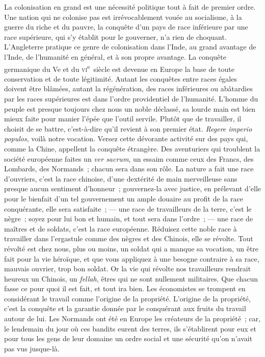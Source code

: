 \documentclass[french,twoside]{book} %
\begin{document}
La colonisation en grand est une nécessité politique tout à fait de premier ordre. Une nation qui ne colonise pas est irrévocablement vouée au socialisme, à la guerre du riche et du pauvre, la conquête d’un pays de race inférieure par une race supérieure, qui s’y établit pour le gouverner, n’a rien de choquant. L’Angleterre pratique ce genre de colonisation dans l’Inde, au grand avantage de l’Inde, de l’humanité en général, et à son propre avantage. La conquête germanique du Ve et du \textsc{vi}\textsuperscript{e} siècle est devenue en Europe la base de toute conservation et de toute légitimité. Autant les conquêtes entre races égales doivent être blâmées, autant la régénération, des races inférieures ou abâtardies par les races supérieures est dans l’ordre providentiel de l’humanité. L’homme du peuple est presque toujours chez nous un noble déclassé, sa lourde main est bien mieux faite pour manier l’épée que l’outil servile. Plutôt que de travailler, il choisit de se battre, c’est-à-dire qu’il revient à son premier état. {\itshape Regere imperio populos}, voilà notre vocation. Versez cette dévorante activité sur des pays qui, comme la Chine, appellent la conquête étrangère. Des aventuriers qui troublent la société européenne faites un {\itshape ver sacrum}, un essaim comme ceux des Francs, des Lombards, des Normands ; chacun sera dans son rôle. La nature a fait une race d’ouvriers, c’est la race chinoise, d’une dextérité de main merveilleuse sans presque aucun sentiment d’honneur ; gouvernez-la avec justice, en prélevant d’elle pour le bienfait d’un tel gouvernement un ample douaire au profit de la race conquérante, elle sera satisfaite ; — une race de travailleurs de la terre, c’est le nègre ; soyez pour lui bon et humain, et tout sera dans l’ordre ; — une race de maîtres et de soldats, c’est la race européenne. Réduisez cette noble race à travailler dans l’ergastule comme des nègres et des Chinois, elle se révolte. Tout révolté est chez nous, plus ou moins, un soldat qui a manque sa vocation, un être fait pour la vie héroïque, et que vous appliquez à une besogne contraire à sa race, mauvais ouvrier, trop bon soldat. Or la vie qui révolte nos travailleurs rendrait heureux un Chinois, un {\itshape fellah}, êtres qui ne sont nullement militaires. Que chacun fasse ce pour quoi il est fait, et tout ira bien. Les économistes se trompent en considérant le travail comme l’origine de la propriété. L’origine de la propriété, c’est la conquête et la garantie donnée par le conquérant aux fruits du travail autour de lui. Les Normands ont été en Europe les créateurs de la propriété ; car, le lendemain du jour où ces bandits eurent des terres, ils s’établirent pour eux et pour tous les gens de leur domaine un ordre social et une sécurité qu’on n’avait pas vus jusque-là.
\end{document}
